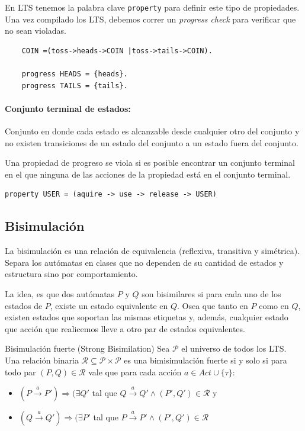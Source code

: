 En LTS tenemos la palabra clave \texttt{property} para definir este tipo de propiedades. Una vez compilado los LTS, debemos correr un \textit{progress check} para verificar que no sean violadas.

\begin{verbatim}
    COIN =(toss->heads->COIN |toss->tails->COIN).
    
    progress HEADS = {heads}.
    progress TAILS = {tails}.
\end{verbatim}

 \paragraph{Conjunto terminal de estados:} Conjunto en donde cada estado es alcanzable desde cualquier otro del conjunto y no existen transiciones de un estado del conjunto a un estado fuera del conjunto.
 
 Una propiedad de progreso se viola si es posible encontrar un conjunto terminal en el que ninguna de las acciones de la propiedad está en el conjunto terminal.
\begin{verbatim}
property USER = (aquire -> use -> release -> USER)
\end{verbatim}

\subsection{Bisimulación}
La  bisimulación es una relación de equivalencia (reflexiva, transitiva y simétrica). Separa los autómatas en clases que no dependen de su cantidad de estados y estructura sino por comportamiento.

La idea, es que dos autómatas $P$ y $Q$ son bisimilares si para cada uno de los estados de $P$, existe un estado equivalente en $Q$. Osea que tanto en $P$ como en $Q$, existen estados que soportan las mismas etiquetas y, además, cualquier estado que acción que realicemos lleve a otro par de estados equivalentes.

\begin{definicion}{Bisimulación fuerte (Strong Bisimilation)}
Sea $\mathcal{P}$ el universo de todos los LTS. Una relación binaria $\mathcal{R}\subseteq\mathcal{P}\times\mathcal{P}$ es una bimisimulación fuerte si y solo si para todo par $(P,Q)\in\mathcal{R}$ vale que para cada acción $a\in Act\cup\{\tau\}$:
\begin{itemize}
\item $(P\overset{a}{\longrightarrow} P') \Rightarrow (\exists Q'$ tal que $Q\overset{a}{\longrightarrow}Q' \land (P', Q')\in\mathcal{R}$ y
\item $(Q\overset{a}{\longrightarrow} Q') \Rightarrow (\exists P'$ tal que $P\overset{a}{\longrightarrow}P' \land (P', Q')\in\mathcal{R}$
\end{itemize}
\end{definicion}

